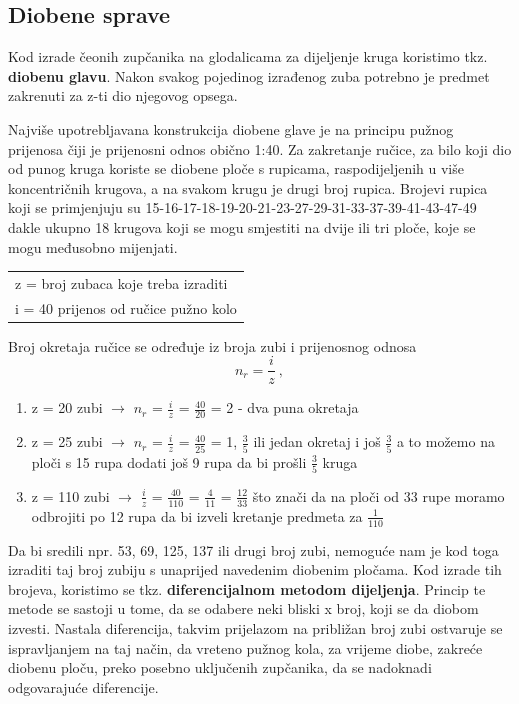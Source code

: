 \documentclass[a4paper,12pt]{article}
\numberwithin{figure}{section}
\begin{document}
\subsection{Diobene sprave}
Kod izrade čeonih zupčanika na glodalicama za dijeljenje kruga koristimo tkz. \textbf{diobenu glavu}. Nakon svakog pojedinog izrađenog zuba potrebno je predmet zakrenuti za z-ti dio njegovog opsega.\par
Najviše upotrebljavana konstrukcija diobene glave je na principu pužnog prijenosa čiji je prijenosni odnos obično 1:40. Za zakretanje ručice, za bilo koji dio od punog kruga koriste se diobene ploče s rupicama, raspodijeljenih u više koncentričnih krugova, a na svakom krugu je drugi broj rupica. Brojevi rupica koji se primjenjuju su 15-16-17-18-19-20-21-23-27-29-31-33-37-39-41-43-47-49 dakle ukupno 18 krugova koji se mogu smjestiti na dvije ili tri ploče, koje se mogu međusobno mijenjati.
\begin{table}[!h]
\centering
\begin{tabular}{l}
z = broj zubaca koje treba izraditi  \\
i = 40  prijenos od ručice pužno kolo  
\end{tabular}
\end{table}
\FloatBarrier
Broj okretaja ručice se određuje iz broja zubi i prijenosnog odnosa
\begin{equation*}
n_{r} = \frac{i}{z}\:,
\end{equation*}
\begin{enumerate}
\item z = 20 zubi $\rightarrow$ $\displaystyle{n_{r}}$ = $\displaystyle{\frac{i}{z}}$ = $\displaystyle{\frac{40}{20}}$ = 2 - dva puna okretaja
\item z = 25 zubi $\rightarrow$ $n_{r}$ = $\displaystyle{\frac{i}{z}}$ = $\displaystyle{\frac{40}{25}}$ = 1, $\displaystyle{\frac{3}{5}}$ ili jedan okretaj i još $\displaystyle{\frac{3}{5}}$ a to možemo na ploči s 15 rupa dodati još 9 rupa da bi prošli $\displaystyle{\frac{3}{5}}$ kruga
\item z = 110 zubi $\rightarrow$ $\displaystyle{\frac{i}{z}}$ = $\displaystyle{\frac{40}{110}}$ = $\displaystyle{\frac{4}{11}}$ = $\displaystyle{\frac{12}{33}}$ što znači da na ploči od 33 rupe moramo odbrojiti po 12 rupa da bi izveli kretanje predmeta za $\displaystyle{\frac{1}{110}}$
\end{enumerate}
Da bi sredili npr. 53, 69, 125, 137 ili drugi broj zubi, nemoguće nam je kod toga izraditi taj broj zubiju s unaprijed navedenim diobenim pločama. Kod izrade tih brojeva, koristimo se tkz. \textbf{diferencijalnom metodom dijeljenja}. Princip te metode se sastoji u tome, da se odabere neki bliski x broj, koji se da diobom izvesti. Nastala diferencija, takvim prijelazom na približan broj zubi ostvaruje se ispravljanjem na taj način, da vreteno pužnog kola, za vrijeme diobe, zakreće diobenu ploču, preko posebno uključenih zupčanika, da se nadoknadi odgovarajuće diferencije.
\end{document}
